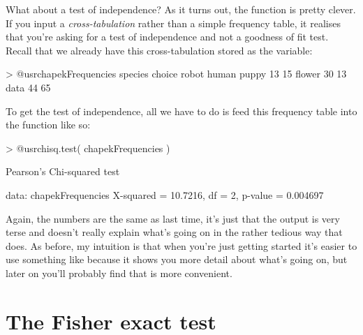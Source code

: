 What about a test of independence? As it turns out, the  function is pretty clever. If you input a {\it cross-tabulation} rather than a simple frequency table, it realises that you're asking for a test of independence and not a goodness of fit test. Recall that we already have this cross-tabulation stored as the  variable:
\begin{rblock1}
> @usr{chapekFrequencies}
        species
choice   robot human
  puppy     13    15
  flower    30    13
  data      44    65
\end{rblock1}
To get the test of independence, all we have to do is feed this frequency table into the  function like so:
\begin{rblock1}
> @usr{chisq.test( chapekFrequencies )}

	Pearson's Chi-squared test

data:  chapekFrequencies
X-squared = 10.7216, df = 2, p-value = 0.004697
\end{rblock1}
Again, the numbers are the same as last time, it's just that the output is very terse and doesn't really explain what's going on in the rather tedious way that  does. As before, my intuition is that when you're just getting started it's easier to use something like  because it shows you more detail about what's going on, but later on you'll probably find that  is more convenient.



\section{The Fisher exact test~\label{sec:fisherexacttest}}

